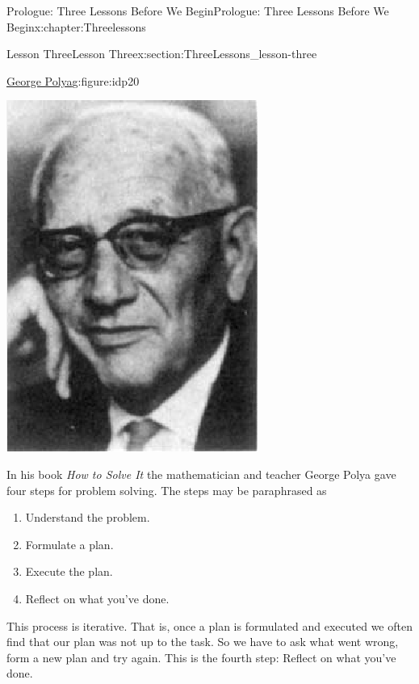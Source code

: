\documentclass[oneside,10pt,]{book}
\numberwithin{equation}{section}
\begin{document}
\begin{chapterptx}{Prologue: Three Lessons Before We Begin}{}{Prologue: Three Lessons Before We Begin}{}{}{x:chapter:Threelessons}
\begin{sectionptx}{Lesson Three}{}{Lesson Three}{}{}{x:section:ThreeLessons_lesson-three}
\begin{figureptx}{\href{https://mathshistory.st-andrews.ac.uk/Biographies/Polya/}{George Polya}\protect\footnotemark{}}{g:figure:idp20}{}
\begin{image}{0.36}{0.28}{0.36}
\includegraphics[width=\linewidth]{images/Polya.png}
\end{image}%
\tcblower
\end{figureptx}%
%
In his book \emph{How to Solve It} the mathematician and teacher George Polya gave four steps for problem solving. The steps may be paraphrased as%
\begin{enumerate}
\item{}Understand the problem.%
\item{}Formulate a plan.%
\item{}Execute the plan.%
\item{}Reflect on what you've done.%
\end{enumerate}
%
\par
This process is iterative. That is, once a plan is formulated and executed we often find that our plan was not up to the task. So we have to ask what went wrong, form a new plan and try again. This is the fourth step: Reflect on what you've done.%

\end{sectionptx}
\end{chapterptx}
\end{document}
